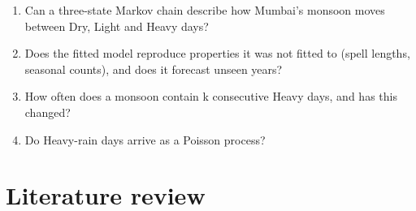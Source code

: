 \documentclass[11pt,a4paper]{article}
\providecommand{\tightlist}{\setlength{\itemsep}{0pt}\setlength{\parskip}{0pt}}
\begin{document}
\begin{enumerate}

\def\labelenumi{\arabic{enumi}.}

\tightlist

\item

  Can a three-state Markov chain describe how Mumbai's monsoon moves between Dry, Light and Heavy days?

\item

  Does the fitted model reproduce properties it was not fitted to (spell lengths, seasonal counts), and does it forecast unseen years?

\item

  How often does a monsoon contain k consecutive Heavy days, and has this changed?

\item

  Do Heavy-rain days arrive as a Poisson process?

\end{enumerate}



\section{Literature review}\label{literature-review}
\end{document}
